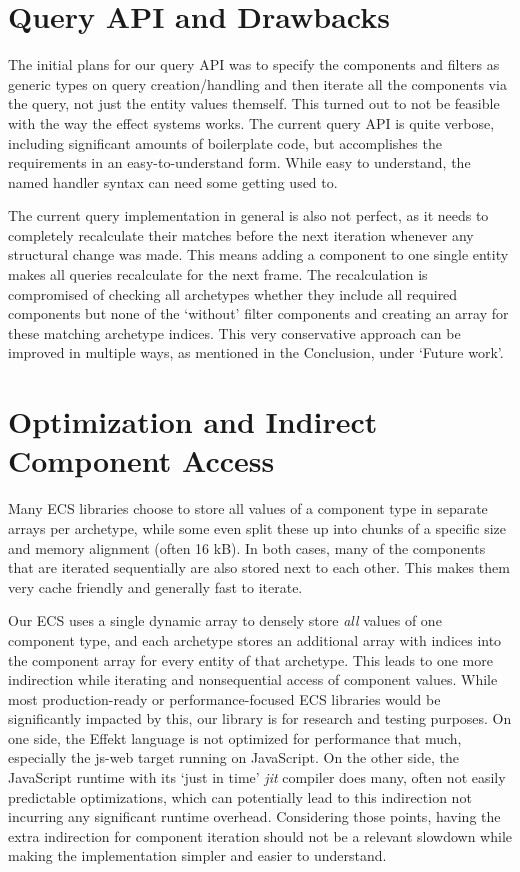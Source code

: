 \section{Query API and Drawbacks}

The initial plans for our query API was to specify the components and filters as generic types on query creation/handling and then iterate all the components via the query, not just the entity values themself. This turned out to not be feasible with the way the effect systems works. The current query API is quite verbose, including significant amounts of boilerplate code, but accomplishes the requirements in an easy-to-understand form. While easy to understand, the named handler syntax can need some getting used to.

The current query implementation in general is also not perfect, as it needs to completely recalculate their matches before the next iteration whenever any structural change was made. This means adding a component to one single entity makes all queries recalculate for the next frame. The recalculation is compromised of checking all archetypes whether they include all required components but none of the `without' filter components and creating an array for these matching archetype indices. This very conservative approach can be improved in multiple ways, as mentioned in the Conclusion, under `Future work'.

\section{Optimization and Indirect Component Access}\label{sec:indirectaccess}

Many ECS libraries choose to store all values of a component type in separate arrays per archetype, while some even split these up into chunks of a specific size and memory alignment (often 16 kB). In both cases, many of the components that are iterated sequentially are also stored next to each other. This makes them very cache friendly and generally fast to iterate.

Our ECS uses a single dynamic array to densely store \textit{all} values of one component type, and each archetype stores an additional array with indices into the component array for every entity of that archetype. This leads to one more indirection while iterating and nonsequential access of component values. While most production-ready or performance-focused ECS libraries would be significantly impacted by this, our library is for research and testing purposes. On one side, the Effekt language is not optimized for performance that much, especially the \textsf{js-web} target running on JavaScript. On the other side, the JavaScript runtime with its `just in time' \textit{jit} compiler does many, often not easily predictable optimizations, which can potentially lead to this indirection not incurring any significant runtime overhead. Considering those points, having the extra indirection for component iteration should not be a relevant slowdown while making the implementation simpler and easier to understand.

